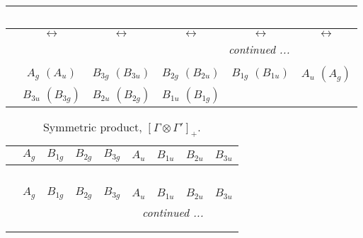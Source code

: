 \documentclass[fleqn,10pt,landscape]{article}
\begin{document}
\begin{itemize}
\begin{center}
\begin{longtable}{cccccc}
\multicolumn{5}{l}{\tablename\ \thetable{}} \\
 \hline \hline
 & $\leftrightarrow$ & $\leftrightarrow$ & $\leftrightarrow$ & $\leftrightarrow$ & $\leftrightarrow$ \\ \hline \endhead

 \hline \hline
\multicolumn{5}{r}{\footnotesize\it continued ...} \\ \endfoot

 \hline \hline
\multicolumn{5}{r}{} \\ \endlastfoot

 & $ A_{g}\,\,(A_{u}) $ & $ B_{3g}\,\,(B_{3u}) $ & $ B_{2g}\,\,(B_{2u}) $ & $ B_{1g}\,\,(B_{1u}) $ & $ A_{u}\,\,(A_{g}) $ \\
& $ B_{3u}\,\,(B_{3g}) $ & $ B_{2u}\,\,(B_{2g}) $ & $ B_{1u}\,\,(B_{1g}) $ & $  $ & $  $ \\
\end{longtable}
\end{center}
\begin{center}
\renewcommand{\arraystretch}{1.0}
\begin{longtable}{c|cccccccc}
\caption{Symmetric product, $[\Gamma\otimes\Gamma']_+.$}
 \\
 \hline \hline
 & $ A_{g} $ & $ B_{1g} $ & $ B_{2g} $ & $ B_{3g} $ & $ A_{u} $ & $ B_{1u} $ & $ B_{2u} $ & $ B_{3u} $ \\ \hline \endfirsthead

\multicolumn{8}{l}{\tablename\ \thetable{}} \\
 \hline \hline
 & $ A_{g} $ & $ B_{1g} $ & $ B_{2g} $ & $ B_{3g} $ & $ A_{u} $ & $ B_{1u} $ & $ B_{2u} $ & $ B_{3u} $ \\ \hline \endhead

 \hline \hline
\multicolumn{8}{r}{\footnotesize\it continued ...} \\ \endfoot

 \hline \hline
\multicolumn{8}{r}{} \\ \endlastfoot


\end{longtable}
\end{center}
\end{itemize}
\end{document}
